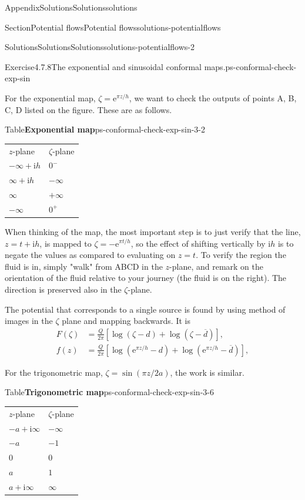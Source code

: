 \documentclass[oneside,10pt,]{book}
\newcommand{\tabularfont}{\relax}
\numberwithin{equation}{section}
\newcommand{\e}{\mathrm{e}}
\newcommand{\im}{\mathrm{i}}
\newcommand{\amp}{&}
\begin{document}
\begin{appendixptx}{Appendix}{Solutions}{}{Solutions}{}{}{solutions}
\begin{sectionptx}{Section}{Potential flows}{}{Potential flows}{}{}{solutions-potentialflows}
\begin{solutions-subsection-numberless}{Solutions}{Solutions}{}{Solutions}{}{}{solutions-potentialflows-2}
\begin{exercisegroup}
\begin{divisionsolutioneg}{Exercise}{4.7.8}{The exponential and sinusoidal conformal maps.}{ps-conformal-check-exp-sin}%
\par\smallskip%
\noindent\hypertarget{ps-conformal-check-exp-sin-3-main}{}For the exponential map, \(\zeta = \e^{\pi z/h}\), we want to check the outputs of points A, B, C, D listed on the figure. These are as follows.%
\begin{tableptx}{Table}{\textbf{Exponential map}}{ps-conformal-check-exp-sin-3-2}{}%
\centering%
{\tabularfont%
\begin{tabular}{ll}
\(z\)-plane&\(\zeta\)-plane\tabularnewline[0pt]
\(-\infty + \im h\)&\(0^-\)\tabularnewline[0pt]
\(\infty + \im h\)&\(-\infty\)\tabularnewline[0pt]
\(\infty\)&\(+\infty\)\tabularnewline[0pt]
\(-\infty\)&\(0^+\)
\end{tabular}
}%
\end{tableptx}%
When thinking of the map, the most important step is to just verify that the line, \(z = t + \im h\), is mapped to \(\zeta = -\e^{\pi t/h}\), so the effect of shifting vertically by \(\im h\) is to negate the values as compared to evaluating on \(z = t\). To verify the region the fluid is in, simply "walk" from ABCD in the \(z\)-plane, and remark on the orientation of the fluid relative to your journey (the fluid is on the right). The direction is preserved also in the \(\zeta\)-plane.%
\par
The potential that corresponds to a single source is found by using method of images in the \(\zeta\) plane and mapping backwards. It is%
\begin{align*}
F(\zeta) \amp= \frac{Q}{2\pi} \left[\log(\zeta - d) + \log(\zeta - \overline{d})\right], \\
f(z) \amp= \frac{Q}{2\pi} \left[\log(\e^{\pi z/h} - d) + \log(\e^{\pi z/h} - \overline{d})\right], 
\end{align*}
%
\par
For the trigonometric map, \(\zeta = \sin(\pi z/2a)\), the work is similar.%
\begin{tableptx}{Table}{\textbf{Trigonometric map}}{ps-conformal-check-exp-sin-3-6}{}%
\centering%
{\tabularfont%
\begin{tabular}{ll}
\(z\)-plane&\(\zeta\)-plane\tabularnewline[0pt]
\(-a + \im \infty\)&\(-\infty\)\tabularnewline[0pt]
\(-a\)&\(-1\)\tabularnewline[0pt]
\(0\)&\(0\)\tabularnewline[0pt]
\(a\)&\(1\)\tabularnewline[0pt]
\(a + \im \infty\)&\(\infty\)
\end{tabular}
}%
\end{tableptx}%

\end{divisionsolutioneg}
\end{exercisegroup}
\end{solutions-subsection-numberless}
\end{sectionptx}
\end{appendixptx}
\end{document}
